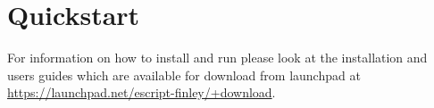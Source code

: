 
%
%
%

\section{Quickstart}
For information on how to install and run \esc please look at the installation and users guides which are available for download from launchpad at  \url{https://launchpad.net/escript-finley/+download}.